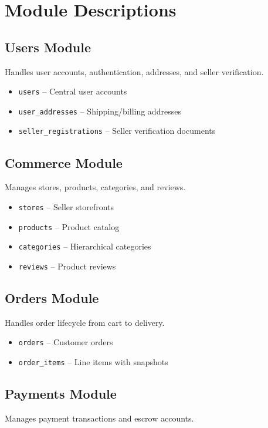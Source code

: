 \documentclass[12pt,a4paper]{report}
\begin{document}
\section{Module Descriptions}

\subsection{Users Module}
Handles user accounts, authentication, addresses, and seller verification.

\begin{itemize}
    \item \texttt{users} -- Central user accounts
    \item \texttt{user\_addresses} -- Shipping/billing addresses
    \item \texttt{seller\_registrations} -- Seller verification documents
\end{itemize}

\subsection{Commerce Module}
Manages stores, products, categories, and reviews.

\begin{itemize}
    \item \texttt{stores} -- Seller storefronts
    \item \texttt{products} -- Product catalog
    \item \texttt{categories} -- Hierarchical categories
    \item \texttt{reviews} -- Product reviews
\end{itemize}

\subsection{Orders Module}
Handles order lifecycle from cart to delivery.

\begin{itemize}
    \item \texttt{orders} -- Customer orders
    \item \texttt{order\_items} -- Line items with snapshots
\end{itemize}

\subsection{Payments Module}
Manages payment transactions and escrow accounts.
\end{document}
